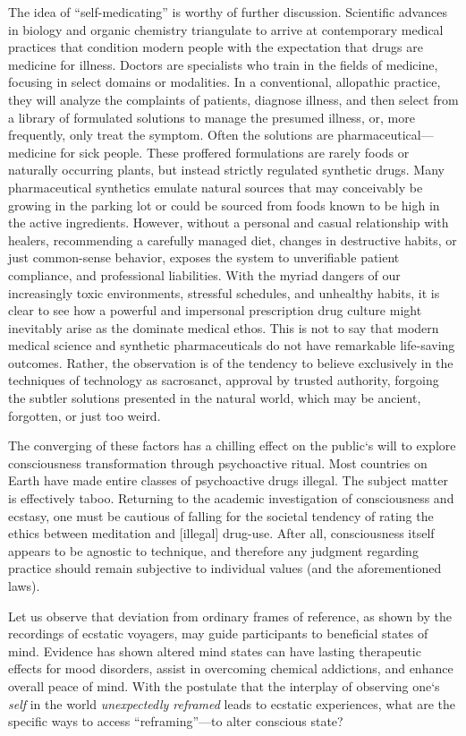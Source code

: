 \documentclass{UIdahoMastersThesis}
\begin{document}
The idea of ``self-medicating'' is worthy of further discussion. Scientific advances in biology and organic chemistry triangulate to arrive at contemporary medical practices that condition modern people with the expectation that drugs are medicine for illness. Doctors are specialists who train in the fields of medicine, focusing in select domains or modalities. In a conventional, allopathic practice, they will analyze the complaints of patients, diagnose illness, and then select from a library of formulated solutions to manage the presumed illness, or, more frequently, only treat the symptom. Often the solutions are pharmaceutical---medicine for sick people. These proffered formulations are rarely foods or naturally occurring plants, but instead strictly regulated synthetic drugs. Many pharmaceutical synthetics emulate natural sources that may conceivably be growing in the parking lot or could be sourced from foods known to be high in the active ingredients. However, without a personal and casual relationship with healers, recommending a carefully managed diet, changes in destructive habits, or just common-sense behavior, exposes the system to unverifiable patient compliance, and professional liabilities. With the myriad dangers of our increasingly toxic environments, stressful schedules, and unhealthy habits, it is clear to see how a powerful and impersonal prescription drug culture might inevitably arise as the dominate medical ethos. This is not to say that modern medical science and synthetic pharmaceuticals do not have remarkable life-saving outcomes. Rather, the observation is of the tendency to believe exclusively in the techniques of technology as sacrosanct, approval by trusted authority, forgoing the subtler solutions presented in the natural world, which may be ancient, forgotten, or just too weird.

The converging of these factors has a chilling effect on the public`s will to explore consciousness transformation through psychoactive ritual. Most countries on Earth have made entire classes of psychoactive drugs illegal. The subject matter is effectively taboo. Returning to the academic investigation of consciousness and ecstasy, one must be cautious of falling for the societal tendency of rating the ethics between meditation and [illegal] drug-use. After all, consciousness itself appears to be agnostic to technique, and therefore any judgment regarding practice should remain subjective to individual values (and the aforementioned laws).

Let us observe that deviation from ordinary frames of reference, as shown by the recordings of ecstatic voyagers, may guide participants to beneficial states of mind. Evidence has shown altered mind states can have lasting therapeutic effects for mood disorders, assist in overcoming chemical addictions, and enhance overall peace of mind. With the postulate that the interplay of observing one`s \emph{self} in the world \emph{unexpectedly reframed} leads to ecstatic experiences, what are the specific ways to access ``reframing''---to alter conscious state?
\end{document}
